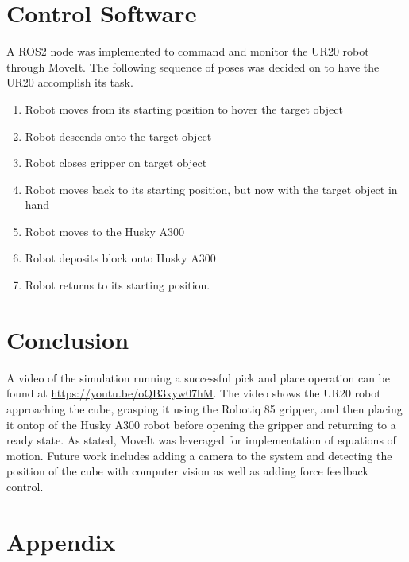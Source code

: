 \documentclass[journal]{new-aiaa}
\begin{document}
\section{Control Software}\label{sec:Control Software}

A ROS2 node was implemented to command and monitor the UR20 robot through MoveIt.
The following sequence of poses was decided on to have the UR20 accomplish its task.

\begin{enumerate}
    \item Robot moves from its starting position to hover the target object
    \item Robot descends onto the target object
    \item Robot closes gripper on target object
    \item Robot moves back to its starting position, but now with the target object in hand
    \item Robot moves to the Husky A300
    \item Robot deposits block onto Husky A300
    \item Robot returns to its starting position. 
\end{enumerate}

\section{Conclusion}\label{sec:Results}
A video of the simulation running a successful pick and place operation can be found at \url{https://youtu.be/oQB3xyw07hM}.
The video shows the UR20 robot approaching the cube, grasping it using the Robotiq 85 gripper, and then placing it ontop of the Husky A300 robot before opening the gripper and returning to a ready state.
As stated, MoveIt was leveraged for implementation of equations of motion.
Future work includes adding a camera to the system and detecting the position of the cube with computer vision as well as adding force feedback control.

\newpage
\section*{Appendix}\label{sec:Appendix}
\end{document}
